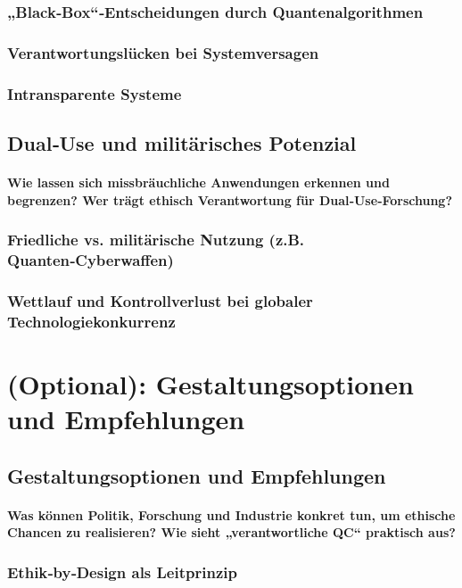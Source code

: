 {\subsubsection{ „Black‑Box“‑Entscheidungen durch Quantenalgorithmen}
\subsubsection{Verantwortungslücken bei Systemversagen}
\subsubsection{Intransparente Systeme}

\subsection{Dual‑Use und militärisches Potenzial}
\paragraph{Wie lassen sich missbräuchliche Anwendungen erkennen und begrenzen? 
Wer trägt ethisch Verantwortung für Dual‑Use‑Forschung?}

\subsubsection{Friedliche vs. militärische Nutzung (z.B. Quanten‑Cyberwaffen)}
\subsubsection{Wettlauf und Kontrollverlust bei globaler Technologiekonkurrenz}

\section{(Optional): Gestaltungsoptionen und Empfehlungen}

\subsection{Gestaltungsoptionen und Empfehlungen}
\paragraph{Was können Politik, Forschung und Industrie konkret tun, um ethische Chancen zu realisieren? 
Wie sieht „verantwortliche QC“ praktisch aus?}

\subsubsection{Ethik‑by‑Design als Leitprinzip}
}
